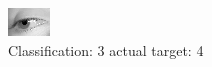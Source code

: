 \begin{figure}[h!]
\begin{center}
\includegraphics[width=0.60\columnwidth]{figures/ID3012_class_3_target_4.png}
\end{center}
\caption{ Classification: 3 actual target: 4}
\label{fig:ID3012_class_3_target_4}
\end{figure}
